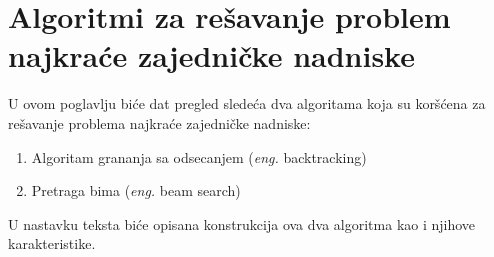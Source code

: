 \documentclass[12pt,oneside]{memoir}
\begin{document}

\chapter{Algoritmi za rešavanje problem najkraće zajedničke nadniske}
U ovom poglavlju biće dat pregled sledeća dva algoritama koja su koršćena za rešavanje problema najkraće zajedničke
nadniske:
\label{chap:algoritmi}

\begin{enumerate}
  \item Algoritam grananja sa odsecanjem (\textit{eng.} backtracking)
  \item Pretraga bima (\textit{eng.} beam search)
\end{enumerate}
U nastavku teksta biće opisana konstrukcija ova dva algoritma kao i njihove karakteristike.
\end{document}
